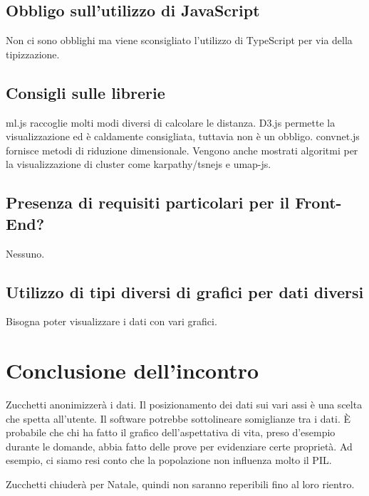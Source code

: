 \documentclass{article}
\begin{document}
    \subsection{Obbligo sull'utilizzo di JavaScript}
    \label{sub:domanda_16}
    Non ci sono obblighi ma viene sconsigliato l'utilizzo di TypeScript per via della tipizzazione.

    \subsection{Consigli sulle librerie}
    \label{sub:domanda_17}
    ml.js raccoglie molti modi diversi di calcolare le distanza. D3.js permette la visualizzazione ed è caldamente consigliata, tuttavia non è un obbligo.
    convnet.js fornisce metodi di riduzione dimensionale. Vengono anche mostrati algoritmi per la visualizzazione di cluster come karpathy/tsnejs e umap-js.

    \subsection{Presenza di requisiti particolari per il Front-End?}
    \label{sub:domanda_18}
    Nessuno.

    \subsection{Utilizzo di tipi diversi di grafici per dati diversi}
    \label{sub:domanda_19}
    Bisogna poter visualizzare i dati con vari grafici.

\section{Conclusione dell'incontro}
\label{sec:conclusione}
Zucchetti anonimizzerà i dati. Il posizionamento dei dati sui vari assi è una scelta che spetta all'utente. Il software potrebbe sottolineare somiglianze tra i dati. È probabile che chi ha fatto il grafico dell'aspettativa di vita, preso d'esempio durante le domande, abbia fatto delle prove per evidenziare certe proprietà. Ad esempio, ci siamo resi conto che la popolazione non influenza molto il PIL.

Zucchetti chiuderà per Natale, quindi non saranno reperibili fino al loro rientro.
\end{document}
